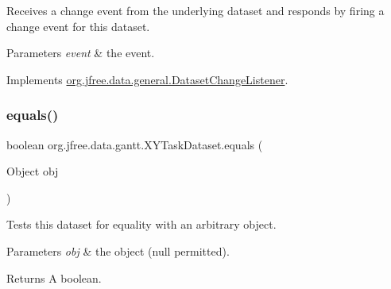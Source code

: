Receives a change event from the underlying dataset and responds by firing a change event for this dataset.


\begin{DoxyParams}{Parameters}
{\em event} & the event. \\
\hline
\end{DoxyParams}


Implements \mbox{\hyperlink{interfaceorg_1_1jfree_1_1data_1_1general_1_1_dataset_change_listener_a26ca53969f0dfa539f52e846a3cd72fe}{org.\+jfree.\+data.\+general.\+Dataset\+Change\+Listener}}.

\mbox{\label{classorg_1_1jfree_1_1data_1_1gantt_1_1_x_y_task_dataset_a716ce2cb9b417860f0c9a1fc40944452}} 
\subsubsection{\texorpdfstring{equals()}{equals()}}
{\footnotesize\ttfamily boolean org.\+jfree.\+data.\+gantt.\+X\+Y\+Task\+Dataset.\+equals (\begin{DoxyParamCaption}\item[{Object}]{obj }\end{DoxyParamCaption})}

Tests this dataset for equality with an arbitrary object.


\begin{DoxyParams}{Parameters}
{\em obj} & the object ({\ttfamily null} permitted).\\
\hline
\end{DoxyParams}
\begin{DoxyReturn}{Returns}
A boolean. 
\end{DoxyReturn}
\mbox{\label{classorg_1_1jfree_1_1data_1_1gantt_1_1_x_y_task_dataset_a6c72bd645d635c254bfdac3dfd15f2cf}} 

